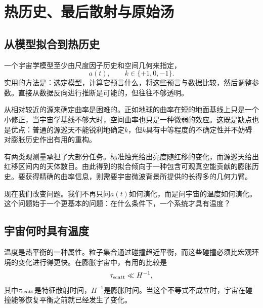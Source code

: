 \chapter{热历史、最后散射与原始汤}


\section{从模型拟合到热历史}

一个宇宙学模型至少由尺度因子历史和空间几何来指定，
\begin{equation}
a(t),
\qquad
k\in\{+1,0,-1\}.
\end{equation}
实用的方法是：选定模型，计算它预言什么，将这些预言与数据比较，然后调整参数。直接从数据反向进行推断是可能的，但往往不够透明。

从相对较近的源来确定曲率是困难的。正如地球的曲率在短的地面基线上只是一个小修正，当宇宙学基线不够大时，空间曲率也只是一种微弱的效应。这既是缺点也是优点：普通的源巡天不能锐利地确定\(k\)，但\(k\)具有中等程度的不确定性并不妨碍对膨胀历史作出有用的重构。

有两类观测量承担了大部分任务。标准烛光给出亮度随红移的变化，而源巡天给出红移区间内的天体数目。由此得到的拟合倾向于一种包含可观真空能贡献的膨胀历史。要获得精确的曲率信息，则需要宇宙微波背景所提供的长得多的几何力臂。

现在我们改变问题。我们不再只问\(a(t)\)如何演化，而是问宇宙的温度如何演化。这个问题始于一个更基本的问题：在什么条件下，一个系统才具有温度？

\section{宇宙何时具有温度}

温度是热平衡的一种属性。粒子集合通过碰撞趋近平衡，而这些碰撞必须比宏观环境的变化进行得更快。在膨胀宇宙中，有用的比较是
\begin{equation}
\tau_{\rm scatt}\ll H^{-1},
\label{eq:c07-equilibrium-condition}
\end{equation}
其中\(\tau_{\rm scatt}\)是特征散射时间，\(H^{-1}\)是膨胀时间。当这个不等式不成立时，宇宙在碰撞能够恢复平衡之前就已经发生了变化。

